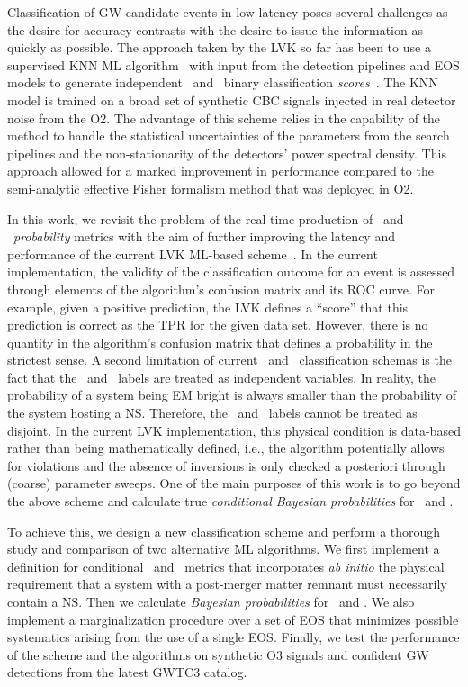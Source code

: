 Classification of \ac{GW} candidate events in low latency poses several challenges as the desire for accuracy contrasts with the desire to issue the information as quickly as possible. The
approach taken by the \ac{LVK} so far has been to use a supervised \ac{KNN} \ac{ML} algorithm~\cite{Pedregosa:2011ork} with input from the detection pipelines and \ac{EOS} models to generate
independent \hasns\ and \hasrem\ binary classification \emph{scores}~\cite{Chatterjee:2019avs}. The \ac{KNN} model is trained on a broad set of synthetic \ac{CBC} signals injected in real
detector noise from the \ac{O2}. The advantage of this scheme relies in the capability of the method to handle the statistical uncertainties of the parameters from the search pipelines and the
non-stationarity of the detectors' power spectral density. This approach allowed for a marked improvement in performance compared to the semi-analytic effective Fisher formalism method that
was deployed in \ac{O2}.

In this work, we revisit the problem of the real-time production of \hasns\ and \hasrem\ \emph{probability} metrics with the aim of further improving the latency and performance of the current
\ac{LVK} \ac{ML}-based scheme~\cite{Chatterjee:2019avs}. In the current implementation, the validity of the classification outcome for an event is assessed through elements of the algorithm's
confusion matrix and its \ac{ROC} curve. For example, given a positive prediction, the \ac{LVK} defines a ``score'' that this prediction is correct as the \ac{TPR} for the given data
set. However, there is no quantity in the algorithm's confusion matrix that defines a probability in the strictest sense. A second limitation of current \hasns\ and \hasrem\ classification
schemas is the fact that the \hasns\ and \hasrem\ labels are treated as independent variables. In reality, the probability of a system being \ac{EM} bright is always smaller than the probability
of the system hosting a \ac{NS}. Therefore, the \hasns\ and \hasrem\ labels cannot be treated as disjoint. In the current \ac{LVK} implementation, this physical condition is data-based rather
than being mathematically defined, i.e., the algorithm potentially allows for violations and the absence of inversions is only checked a posteriori through (coarse) parameter sweeps. One of the
main purposes of this work is to go beyond the above scheme and calculate true \emph{conditional Bayesian probabilities} for \hasns\ and \hasrem. 

To achieve this, we design a new classification scheme and perform a thorough study and comparison of two alternative \ac{ML} algorithms. We first implement a definition for conditional \hasns\
and \hasrem\ metrics that incorporates \emph{ab initio} the physical requirement that a system with a post-merger matter remnant must necessarily contain a \ac{NS}. Then we calculate
\emph{Bayesian probabilities} for \hasns\ and \hasrem. We also implement a marginalization procedure over a set of \ac{EOS} that minimizes possible systematics arising from the use of a single
\ac{EOS}. Finally, we test the performance of the scheme and the algorithms on synthetic \ac{O3} signals and confident \ac{GW} detections from the latest \ac{GWTC3} catalog.

